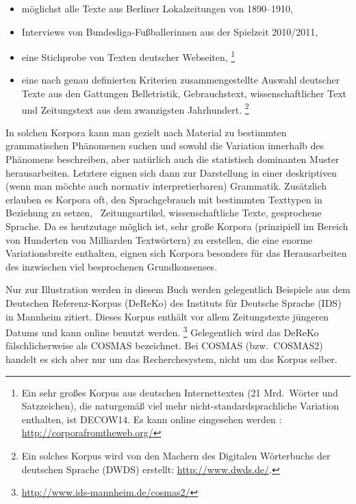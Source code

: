 
\begin{itemize}\Lf
  \item möglichst alle Texte aus Berliner Lokalzeitungen von 1890--1910,
  \item Interviews von Bundesliga-Fußballerinnen aus der Spielzeit 2010\slash 2011,
  \item eine Stichprobe von Texten deutscher Webseiten,%
		\footnote{Ein sehr großes Korpus aus deutschen Internettexten (21 Mrd.\ Wörter und Satzzeichen), die naturgemäß viel mehr nicht-standardsprachliche Variation enthalten, ist DECOW14.
		Es kann online eingesehen werden \citep{SchaeferBildhauer2012a}: \url{http://corporafromtheweb.org/}}
  \item eine nach genau definierten Kriterien zusammengestellte Auswahl deutscher Texte aus den Gattungen Belletristik, Gebrauchstext, wissenschaftlicher Text und Zeitungstext aus dem zwanzigsten Jahrhundert.%
		\footnote{Ein solches Korpus wird von den Machern des Digitalen Wörterbuchs der deutschen Sprache (DWDS) erstellt: \url{http://www.dwds.de/}.}
\end{itemize}

In solchen Korpora kann man gezielt nach Material zu bestimmten grammatischen Phänomenen suchen und sowohl die Variation innerhalb des Phänomens beschreiben, aber natürlich auch die statistisch dominanten Muster herausarbeiten.
Letztere eignen sich dann zur Darstellung in einer deskriptiven (wenn man möchte auch normativ interpretierbaren) Grammatik.
Zusätzlich erlauben es Korpora oft, den Sprachgebrauch mit bestimmten Texttypen in Beziehung zu setzen, \zB\ Zeitungsartikel, wissenschaftliche Texte, gesprochene Sprache.
Da es heutzutage möglich ist, sehr große Korpora (prinzipiell im Bereich von Hunderten von Milliarden Textwörtern) zu erstellen, die eine enorme Variationsbreite enthalten, eignen sich Korpora besonders für das Herausarbeiten des inzwischen viel besprochenen Grundkonsenses.

Nur zur Illustration werden in diesem Buch werden gelegentlich Beispiele aus dem Deutschen Referenz-Korpus (DeReKo) des Instituts für Deutsche Sprache (IDS) in Mannheim zitiert.
Dieses Korpus enthält vor allem Zeitungstexte jüngeren Datums und kann online benutzt werden.%
\footnote{\url{http://www.ids-mannheim.de/cosmas2/}}
Gelegentlich wird das DeReKo fälschlicherweise als COSMAS bezeichnet.
Bei COSMAS (bzw.\ COSMAS2) handelt es sich aber nur um das Recherchesystem, nicht um das Korpus selber.

